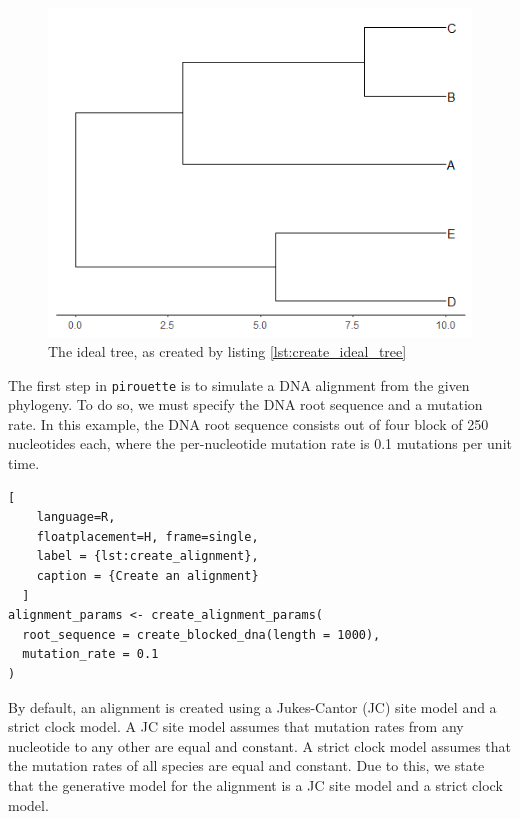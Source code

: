 \documentclass{article}
\begin{document}
\begin{figure}[h]
  \includegraphics[width=\textwidth]{figure_bd.png}
  \caption{The ideal tree, as created by listing \ref{lst:create_ideal_tree}}
\end{figure}

The first step in \verb;pirouette; is to simulate a DNA alignment from the given phylogeny. To do so, we must specify the DNA root sequence and a mutation rate. In this example, the DNA root sequence consists out of four block of 250 nucleotides each, where the per-nucleotide mutation rate is 0.1 mutations per unit time.

\begin{lstlisting}[
    language=R,
    floatplacement=H, frame=single,
    label = {lst:create_alignment}, 
    caption = {Create an alignment}
  ]
alignment_params <- create_alignment_params(
  root_sequence = create_blocked_dna(length = 1000),
  mutation_rate = 0.1
)
\end{lstlisting}

By default, an alignment is created using a Jukes-Cantor (JC) site model
and a strict clock model. A JC site model assumes that mutation rates from any nucleotide to any other are equal and constant. A strict clock model assumes that the mutation rates of all species are equal and constant.
Due to this, we state that the generative model for the alignment is
a JC site model and a strict clock model.

\end{document}
